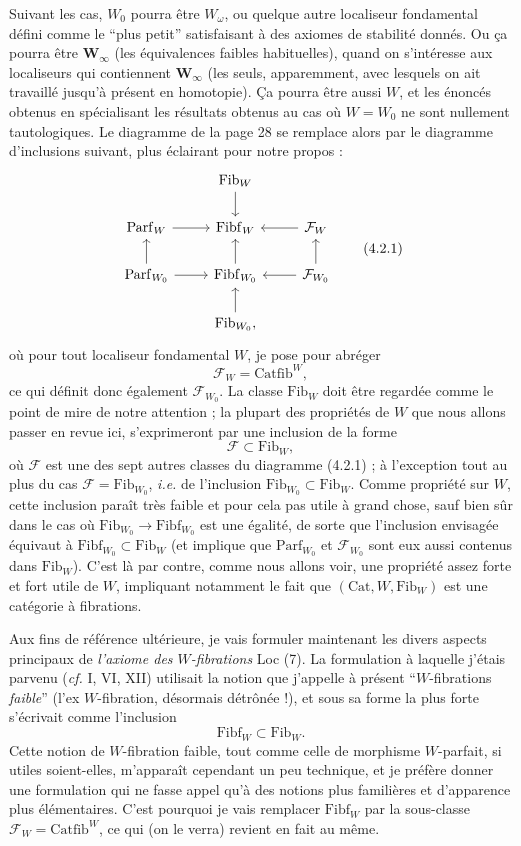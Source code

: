 \documentclass[11pt]{article}
\newcommand{\printedpage}[1]{\marginpar{\footnotesize p.~#1}}
\newcommand{\msp}[1]{\marginpar{\footnotesize [#1]}}
\newcommand{\Cat}{\mathrm{Cat}}
\newcommand{\Fib}{\mathrm{Fib}}
\newcommand{\Fibf}{\mathrm{Fibf}}
\newcommand{\Parf}{\mathrm{Parf}}
\newcommand{\Catfib}{\mathrm{Catfib}}
\begin{document}
Suivant les cas, $W_0$ pourra être $W_\omega$, ou quelque autre localiseur fondamental défini comme le “plus petit” satisfaisant à des axiomes de stabilité donnés. Ou ça pourra être $\mathbf{W}_\infty$ (les équivalences faibles habituelles), quand on s'intéresse aux localiseurs qui contiennent $\mathbf{W}_\infty$ (les seuls, apparemment, avec lesquels on ait travaillé jusqu'à présent en homotopie). Ça pourra être aussi $W$, et les énoncés obtenus en spécialisant les résultats obtenus au cas où $W = W_0$ ne sont nullement tautologiques. Le diagramme de la page 28 se remplace alors par le diagramme d'inclusions suivant, plus éclairant pour notre propos :
\[
\begin{tikzcd}
 & \Fib_W \arrow[d] & \\
\Parf_W \arrow[r] & \Fibf_W & \mathcal{F}_W \arrow[l] \\
\Parf_{W_0} \arrow[r] \arrow[u] & \Fibf_{W_0} \arrow[u] & \mathcal{F}_{W_0} \arrow[l] \arrow[u] \\
 & \Fib_{W_0}, \arrow[u] &
\end{tikzcd}
\tag*{(4.2.1)}
\]
où pour tout localiseur fondamental $W$, je pose pour abréger
\[
\mathcal{F}_W = \Catfib^W,
\]
ce qui définit donc également $\mathcal{F}_{W_0}$. La classe $\Fib_W$ \msp{page 31} doit être regardée comme le point de mire de notre attention ; la plupart des propriétés de $W$ que nous allons passer en revue ici, s'exprimeront par une inclusion de la forme
\[
\mathcal{F} \subset \Fib_W,
\]
où $\mathcal{F}$ est une des sept autres classes du diagramme (4.2.1) ; à l'exception tout au plus du cas $\mathcal{F} = \Fib_{W_0}$, \textit{i.e.} de l'inclusion $\Fib_{W_0} \subset \Fib_W$. Comme propriété sur $W$, cette inclusion paraît très faible et pour cela pas utile à grand chose, sauf bien sûr dans le cas où $\Fib_{W_0} \longrightarrow \Fibf_{W_0}$ est une égalité, de sorte que l'inclusion envisagée équivaut à $\Fibf_{W_0} \subset \Fib_W$ (et implique que $\Parf_{W_0}$ et $\mathcal{F}_{W_0}$ sont eux aussi contenus dans $\Fib_W$). C'est là par contre, comme nous allons voir, une propriété assez forte et fort utile de $W$, impliquant notamment le fait que $(\Cat, W, \Fib_W)$ est une catégorie à fibrations.

\printedpage{21}

\msp{page 32}

Aux fins de référence ultérieure, je vais formuler maintenant les divers aspects principaux de \textit{l'axiome des $W$-fibrations} Loc (7). La formulation à laquelle j'étais parvenu (\textit{cf.} I, VI, XII) utilisait la notion que j'appelle à présent “$W$-fibrations \textit{faible}” (l'ex $W$-fibration, désormais détrônée !), et sous sa forme la plus forte s'écrivait comme l'inclusion %
\[
\Fibf_W \subset \Fib_W.
\]
Cette notion de $W$-fibration faible, tout comme celle de morphisme $W$-parfait, si utiles soient-elles, m'apparaît cependant un peu technique, et je préfère donner une formulation qui ne fasse appel qu'à des notions plus familières et d'apparence plus élémentaires. C'est pourquoi je vais remplacer $\Fibf_W$ par la sous-classe $\mathcal{F}_W = \Catfib^W$, ce qui (on le verra) revient en fait au même.
\end{document}
